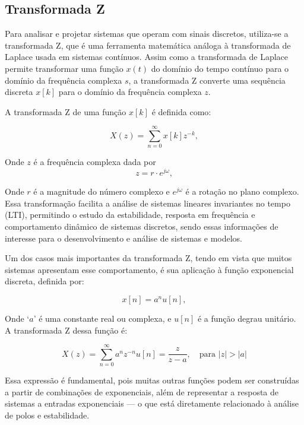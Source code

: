 \subsection{Transformada Z}
Para analisar e projetar sistemas que operam com sinais discretos, utiliza-se a transformada Z, que é uma ferramenta matemática análoga à transformada de Laplace usada em sistemas contínuos. Assim como a transformada de Laplace permite transformar uma função \( x(t) \) do domínio do tempo contínuo para o domínio da frequência complexa \( s \), a transformada Z converte uma sequência discreta \( x[k] \) para o domínio da frequência complexa \( z \).

A transformada Z de uma função \( x[k] \) é definida como:

\begin{equation}
X(z) = \sum_{n=0}^{\infty} x[k] z^{-k},
\label{eq:tz_def}
\end{equation}

Onde \( z \) é a frequência complexa dada por
\begin{equation}
z = r\cdot e^{j\omega},
\label{eq:z_complex}
\end{equation}

Onde \( r \) é a magnitude do número complexo e \( e^{j\omega} \) é a rotação no plano complexo.
Essa transformação facilita a análise de sistemas lineares invariantes no tempo (LTI), permitindo o estudo da estabilidade, resposta em frequência e comportamento dinâmico de sistemas discretos, sendo essas informações de interesse para o desenvolvimento e análise de sistemas e modelos.

Um dos casos mais importantes da transformada Z, tendo em vista que muitos sistemas apresentam esse comportamento, é sua aplicação à função exponencial discreta, definida por:

\begin{equation}
x[n] = a^n u[n],
\label{eq:expo_discreta}
\end{equation}

Onde ‘\( a \)' é uma constante real ou complexa, e \( u[n] \) é a função degrau unitário. A transformada Z dessa função é:

\begin{equation}
X(z) = \sum_{n=0}^{\infty} a^n z^{-n}u[n] = \frac{z}{z - a}, \quad \text{para } |z| > |a|
\label{eq:tz_expo}
\end{equation}




Essa expressão é fundamental, pois muitas outras funções podem ser construídas a partir de combinações de exponenciais, além de representar a resposta de sistemas a entradas exponenciais — o que está diretamente relacionado à análise de polos e estabilidade.

